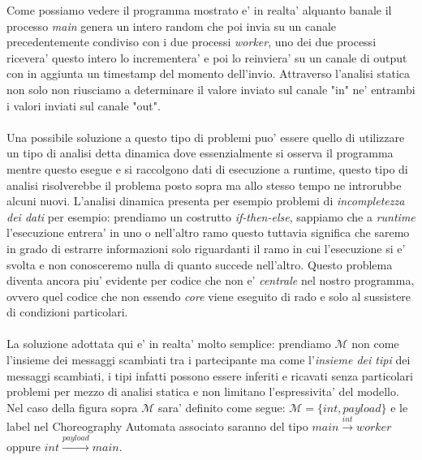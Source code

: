 Come possiamo vedere il programma mostrato e' in realta' alquanto banale il processo \emph{main} genera un intero random che poi invia su un canale precedentemente condiviso con i due processi \emph{worker}, uno dei due processi ricevera' questo intero lo incrementera' e poi lo reinviera' su un canale di output con in aggiunta un timestamp del momento dell'invio. Attraverso l'analisi statica non solo non riusciamo a determinare il valore inviato sul canale "in" ne' entrambi i valori inviati sul canale "out". \\\\
Una possibile soluzione a questo tipo di problemi puo' essere quello di utilizzare un tipo di analisi detta dinamica dove essenzialmente si osserva il programma mentre questo esegue e si raccolgono dati di esecuzione a runtime, questo tipo di analisi risolverebbe il problema posto sopra ma allo stesso tempo ne introrubbe alcuni nuovi. L'analisi dinamica presenta per esempio problemi di \emph{incompletezza dei dati} per esempio: prendiamo un costrutto \emph{if-then-else}, sappiamo che a \emph{runtime} l'esecuzione entrera' in uno o nell'altro ramo questo tuttavia significa che saremo in grado di estrarre informazioni solo riguardanti il ramo in cui l'esecuzione si e' svolta e non conosceremo nulla di quanto succede nell'altro. Questo problema diventa ancora piu' evidente per codice che non e' \emph{centrale} nel nostro programma, ovvero quel codice che non essendo \emph{core} viene eseguito di rado e solo al sussistere di condizioni particolari.\\\\
La soluzione adottata qui e' in realta' molto semplice: prendiamo $\mathcal{M}$ non come l'insieme dei messaggi scambiati tra i partecipante ma come l'\emph{insieme dei tipi} dei messaggi scambiati, i tipi infatti possono essere inferiti e ricavati senza particolari problemi per mezzo di analisi statica e non limitano l'espressivita' del modello. Nel caso della figura sopra $\mathcal{M}$ sara' definito come segue: $\mathcal{M} = \{ int, payload \}$ e le label nel Choreography Automata associato saranno del tipo $main \xrightarrow{int} worker$ oppure $int \xrightarrow{payload} main$.

